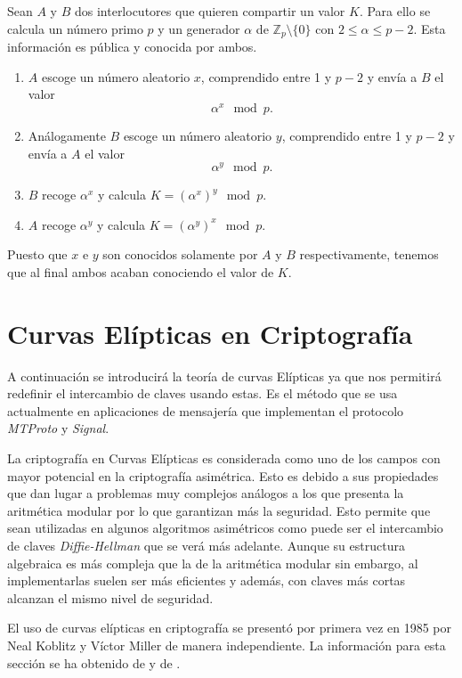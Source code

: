 Sean $A$ y $B$ dos interlocutores que quieren compartir un valor $K$. Para ello se calcula un número primo $p$ y un generador $\alpha$ de $\mathbb{Z}_{p}\setminus\{0\}$ con $2\leq \alpha \leq p-2$. Esta información es pública y conocida por ambos.
\begin{enumerate}
	\item $A$ escoge un número aleatorio $x$, comprendido entre 1 y $p-2$ y envía a $B$ el valor 
		$$
			\alpha^x \mod p.
		$$
	\item Análogamente $B$ escoge un número aleatorio $y$, comprendido entre 1 y $p-2$ y envía a $A$ el valor 
		$$
			\alpha^y \mod p.
		$$

	\item $B$ recoge $\alpha^x$ y calcula $K=(\alpha^x)^y \mod p$.
	\item $A$ recoge $\alpha^y$ y calcula $K=(\alpha^y)^x \mod p$.
\end{enumerate}
Puesto que $x$ e $y$ son conocidos solamente por $A$ y $B$ respectivamente, tenemos que al final ambos acaban conociendo el valor de $K$.\\

\section{Curvas Elípticas en Criptografía}
A continuación se introducirá la teoría de curvas Elípticas ya que nos permitirá redefinir el intercambio de claves usando estas. Es el método que se usa actualmente en aplicaciones de mensajería que implementan el protocolo \emph{MTProto} y \emph{Signal}.

La criptografía en Curvas Elípticas es considerada como uno de los campos con mayor potencial en la criptografía asimétrica.
Esto es debido a sus propiedades que dan lugar a problemas muy complejos análogos a los que presenta la aritmética modular por lo que garantizan más la seguridad. 
Esto permite que sean utilizadas en algunos algoritmos asimétricos como puede ser el intercambio de claves \emph{Diffie-Hellman} que se verá más adelante. 
Aunque su estructura algebraica es más compleja que la de la aritmética modular sin embargo, al implementarlas suelen ser más eficientes y además, con claves más cortas alcanzan 
el mismo nivel de seguridad.

El uso de curvas elípticas en criptografía se presentó por primera vez en 1985 por Neal Koblitz y Víctor Miller de manera independiente.
La información para esta sección se ha obtenido de \cite{En2011} y de \cite{apuntesCriptografia}.

